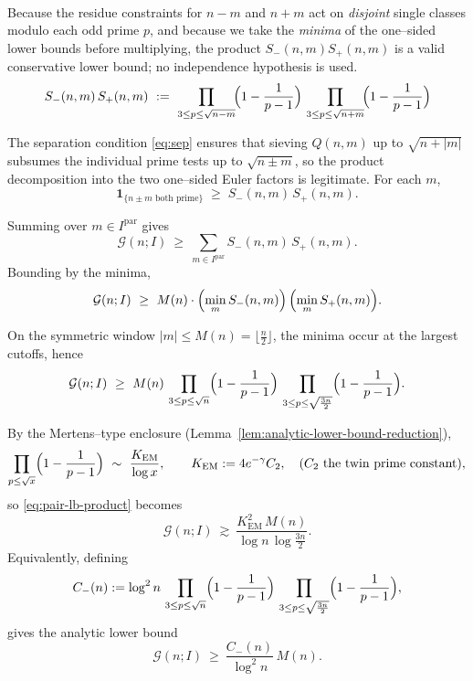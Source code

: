 \documentclass[11pt]{article}
\makeatletter
\theoremstyle{inline}
\theoremstyle{break}
\renewenvironment{proof}[1][\proofname]{%
  \par\pushQED{\qed}%
  \normalfont \topsep6\p@\@plus6\p@\relax
  \trivlist
  \item[\hskip\labelsep
        \itshape
    #1\@addpunct{.}]\mbox{}\\  %
}{%
  \popQED\endtrivlist\@endpefalse
}
\theoremstyle{break}
\theoremstyle{break}
\theoremstyle{break}
\theoremstyle{break}
\theoremstyle{break}
\theoremstyle{break}
\theoremstyle{inline}
\newcommand{\CminusProduct}{C_{-}}
\newcommand{\Kem}{K_{\mathrm{EM}}}              %
\makeatother
\begin{document}
\begin{proof}
Because the residue constraints for \(n-m\) and \(n+m\) act on \emph{disjoint} single classes modulo each odd prime \(p \), and because we take the \emph{minima} of the one–sided lower bounds before multiplying, the product \(S_-(n,m)S_+(n,m)\) is a valid conservative lower bound; no independence hypothesis is used.
\begin{equation}
S_{-}(n,m)\,S_{+}(n,m)
\ :=\
\prod_{3\le p\le \sqrt{n-m}}\!\Bigl(1-\frac{1}{p-1}\Bigr)\,
\prod_{3\le p\le \sqrt{n+m}}\!\Bigl(1-\frac{1}{p-1}\Bigr)
\end{equation}

The separation condition \eqref{eq:sep} ensures that sieving \(Q(n,m)\) up to \(\sqrt{n+|m|}\) subsumes the individual prime tests up to \(\sqrt{n\pm m}\), so the product decomposition into the two one–sided Euler factors is legitimate.  For each \(m\),
\begin{equation}
\mathbf{1}_{\{\text{\(n\pm m\) both prime}\}}\;\ge\;S_-(n,m)\,S_+(n,m).
\end{equation}

Summing over \(m\in I^{\mathrm{par}}\) gives
\begin{equation}
\mathcal G(n;I)\ \ge\ \sum_{m\in I^{\mathrm{par}}} S_-(n,m)\,S_+(n,m).
\end{equation}
Bounding by the minima,
\begin{equation}
\mathcal G(n;I)\ \ge\
M(n)\cdot\Bigl(\min_{m}S_-(n,m)\Bigr)\,\Bigl(\min_{m}S_+(n,m)\Bigr).
\end{equation}

On the symmetric window \(|m|\le M(n)=\lfloor \frac{n}{2}\rfloor\), the minima
occur at the largest cutoffs, hence
\begin{equation}\label{eq:pair-lb-product}
\mathcal G(n;I)\ \ge\
M(n)\,
\prod_{3\le p\le \sqrt n}\Bigl(1-\frac{1}{p-1}\Bigr)\,
\prod_{3\le p\le \sqrt{\frac{3n}{2}}}\Bigl(1-\frac{1}{p-1}\Bigr).
\end{equation}

\medskip
\noindent
By the Mertens--type enclosure (Lemma~\ref{lem:analytic-lower-bound-reduction}),
\begin{equation}
\prod_{p\le \sqrt x}\Bigl(1-\frac{1}{p-1}\Bigr)\ \sim\ \frac{\Kem}{\log x},
\qquad \Kem:=4e^{-\gamma}C_2,\quad (C_2 \text{ the twin prime constant}),
\end{equation}
so \eqref{eq:pair-lb-product} becomes
\begin{equation}
\mathcal G(n;I)\ \gtrsim\
\frac{\Kem^2\,M(n)}{\log n\,\log{\frac{3n}{2}}}.
\end{equation}
Equivalently, defining
\begin{equation}\label{eq:Cminus}
\CminusProduct(n)
:=\log^2 n\,
\prod_{3\le p\le \sqrt n}\Bigl(1-\frac{1}{p-1}\Bigr)\,
\prod_{3\le p\le \sqrt{\frac{3n}{2}}}\Bigl(1-\frac{1}{p-1}\Bigr),
\end{equation}
gives the analytic lower bound
\begin{equation}
\mathcal G(n;I)\ \ge\ \frac{\CminusProduct(n)}{\log^2 n}\,M(n).
\end{equation}


\end{proof}
\end{document}
